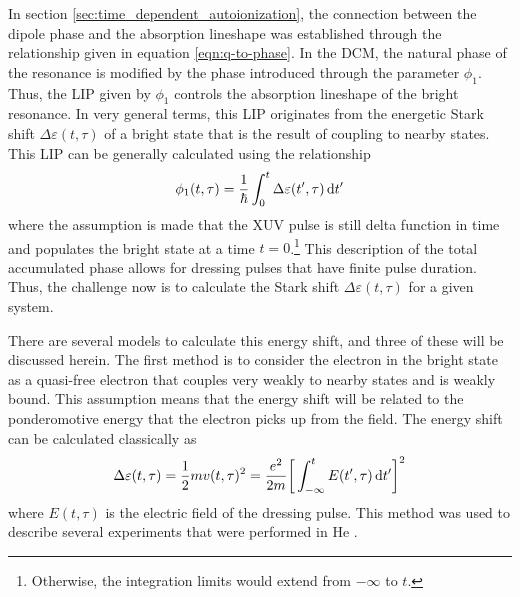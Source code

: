 In section \ref{sec:time_dependent_autoionization}, the connection between the dipole phase and the absorption lineshape was established through the relationship given in equation \ref{eqn:q-to-phase}.  In the DCM, the natural phase of the resonance is modified by the phase introduced through the parameter $\phi_1$.  Thus, the LIP given by $\phi_1$ controls the absorption lineshape of the bright resonance.  In very general terms, this LIP originates from the energetic Stark shift $\Delta\varepsilon(t,\tau)$ of a bright state that is the result of coupling to nearby states.  This LIP can be generally calculated using the relationship
\begin{equation}
	\label{eqn:LIP}
	\phi_{1}(t,\tau) = \frac{1}{\hbar}\int_{0}^{t}\Delta\varepsilon(t',\tau)\mathop{}\!\mathrm{d} t'
\end{equation}
where the assumption is made that the XUV pulse is still delta function in time and populates the bright state at a time $t=0$.\footnote{Otherwise, the integration limits would extend from $-\infty$ to $t$.}  This description of the total accumulated phase allows for dressing pulses that have finite pulse duration.  Thus, the challenge now is to calculate the Stark shift $\Delta\varepsilon(t,\tau)$ for a given system.

There are several models to calculate this energy shift, and three of these will be discussed herein.  The first method is to consider the electron in the bright state as a quasi-free electron that couples very weakly to nearby states and is weakly bound. This assumption means that the energy shift will be related to the ponderomotive energy that the electron picks up from the field.  The energy shift can be calculated classically as
\begin{equation}
	\label{eqn:up_energy_shift}
	\Delta\varepsilon(t,\tau)=\frac{1}{2}m v(t,\tau)^2=\frac{e^2}{2m}\bigg[\int_{-\infty}^{t}E(t',\tau)\mathop{}\!\mathrm{d} t'\bigg]^2
\end{equation}
where $E(t,\tau)$ is the electric field of the dressing pulse.  This method was used to describe several experiments that were performed in He \cite{ottLorentzMeetsFano2013, blattermannSituCharacterizationFewcycle2015}.

